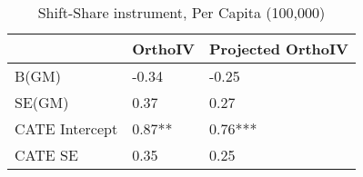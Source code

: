 \begin{table}\centering\caption{Shift-Share instrument, Per Capita (100,000)}\begin{tabular}{lll}
\toprule
                & OrthoIV   & Projected OrthoIV   \\
\midrule
 B(GM)          & -0.34     & -0.25               \\
 SE(GM)         & 0.37      & 0.27                \\
 CATE Intercept & 0.87**    & 0.76***             \\
 CATE SE        & 0.35      & 0.25                \\
\bottomrule
\end{tabular}\end{table}